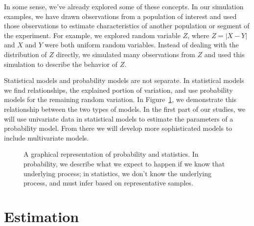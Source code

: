 \documentclass[
  letterpaper,
  DIV=11,
  numbers=noendperiod]{scrreprt}
\begin{document}
In some sense, we've already explored some of these concepts. In our
simulation examples, we have drawn observations from a population of
interest and used those observations to estimate characteristics of
another population or segment of the experiment. For example, we
explored random variable \(Z\), where \(Z=|X - Y|\) and \(X\) and \(Y\)
were both uniform random variables. Instead of dealing with the
distribution of \(Z\) directly, we simulated many observations from
\(Z\) and used this simulation to describe the behavior of \(Z\).

Statistical models and probability models are not separate. In
statistical models we find relationships, the explained portion of
variation, and use probability models for the remaining random
variation. In Figure~\ref{fig-probstats}, we demonstrate this
relationship between the two types of models. In the first part of our
studies, we will use univariate data in statistical models to estimate
the parameters of a probability model. From there we will develop more
sophisticated models to include multivariate models.

\begin{figure}


\caption{\label{fig-probstats}A graphical representation of probability
and statistics. In probability, we describe what we expect to happen if
we know that underlying process; in statistics, we don't know the
underlying process, and must infer based on representative samples.}

\end{figure}%

\section{Estimation}\label{estimation}
\end{document}
